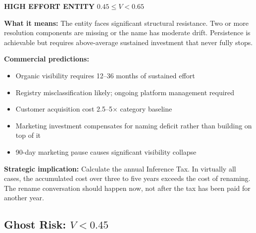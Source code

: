 \documentclass[12pt, openany]{book}
\theoremstyle{thmstyle}
\theoremstyle{defstyle}
\begin{document}
\begin{effortbox}
\textbf{HIGH EFFORT ENTITY} \hfill $0.45 \leq V < 0.65$

\vspace{4pt}
\textbf{What it means:} The entity faces significant structural resistance. Two or more resolution components are missing or the name has moderate drift. Persistence is achievable but requires above-average sustained investment that never fully stops.

\textbf{Commercial predictions:}
\begin{itemize}[leftmargin=1.5em, topsep=2pt]
  \item Organic visibility requires 12--36 months of sustained effort
  \item Registry misclassification likely; ongoing platform management required
  \item Customer acquisition cost 2.5--5$\times$ category baseline
  \item Marketing investment compensates for naming deficit rather than building on top of it
  \item 90-day marketing pause causes significant visibility collapse
\end{itemize}

\textbf{Strategic implication:} Calculate the annual Inference Tax. In virtually all cases, the accumulated cost over three to five years exceeds the cost of renaming. The rename conversation should happen now, not after the tax has been paid for another year.
\end{effortbox}

\subsection{Ghost Risk: $V < 0.45$}
\end{document}
